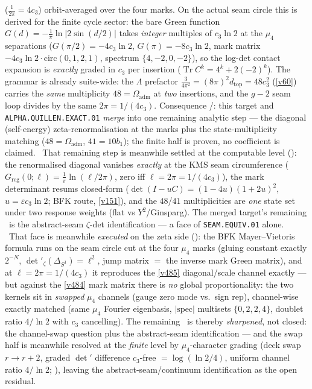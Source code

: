 ($\tfrac1{2\pi}=4c_3$) orbit-averaged over the four marks. On the actual seam circle this is derived for
the finite cycle sector: the bare Green function $G(d)=-\tfrac1\pi\ln|2\sin(d/2)|$ takes \emph{integer}
multiples of $c_3\ln2$ at the $\mu_4$ separations ($G(\pi/2)=-4c_3\ln2$, $G(\pi)=-8c_3\ln2$, mark matrix
$-4c_3\ln2\cdot\mathrm{circ}(0,1,2,1)$, spectrum $\{4,-2,0,-2\}$), so the log-det contact expansion is
\emph{exactly} graded in $c_3$ per insertion ($\operatorname{Tr}C^k=4^k+2(-2)^k$). The grammar is already
suite-wide: the $\Lambda$ prefactor $\tfrac{3}{4\pi^2}=(8\pi)^2 d_{\mathrm{top}}=48c_3^2$ (\vref{v60})
carries the \emph{same} multiplicity $48=\Omega_{\mathrm{adm}}$ at \emph{two} insertions, and the $g{-}2$
seam loop divides by the same $2\pi=1/(4c_3)$. Consequence \mC/\mO: this target and
\texttt{ALPHA.QUILLEN.EXACT.01} \emph{merge} into one remaining analytic step --- the diagonal
(self-energy) zeta-renormalisation at the marks plus the state-multiplicity matching
($48=\Omega_{\mathrm{adm}}$, $41=10b_1$); the finite half is proven, no coefficient is claimed. \mE\ That
remaining step is meanwhile settled at the computable level ():
the renormalised diagonal vanishes \emph{exactly} at the KMS seam circumference
($G_{\mathrm{reg}}(0;\ell)=\tfrac1\pi\ln(\ell/2\pi)$, zero iff $\ell=2\pi=1/(4c_3)$), the mark
determinant resums closed-form ($\det(I-uC)=(1-4u)(1+2u)^2$, $u=\varepsilon c_3\ln2$; BFK route,
\vref{v151}), and the $48$/$41$ multiplicities are \emph{one} state set under two response weights (flat
vs $Y^2$/Ginsparg). The merged target's remaining \mO\ is the abstract-seam $\zeta$-det identification
--- a face of \texttt{SEAM.EQUIV.01} alone. \mE\ That face is meanwhile \emph{executed} on the zeta side
(): the BFK Mayer--Vietoris formula runs on the seam circle cut at
the four $\mu_4$ marks (gluing constant exactly $2^{-N}$, $\det\nolimits'_\zeta(\Delta_{S^1})=\ell^2$,
jump matrix $=$ the inverse mark Green matrix), and at $\ell=2\pi=1/(4c_3)$ it reproduces the \vref{v485}
diagonal/scale channel exactly --- but against the \vref{v484} mark matrix there is \emph{no} global
proportionality: the two kernels sit in \emph{swapped} $\mu_4$ channels (gauge zero mode vs.\ sign rep),
channel-wise exactly matched (same $\mu_4$ Fourier eigenbasis, $|\mathrm{spec}|$ multisets $\{0,2,2,4\}$,
doublet ratio $4/\ln2$ with $c_3$ cancelling). The remaining \mO\ is thereby \emph{sharpened}, not
closed: the channel-swap question plus the abstract-seam identification --- and the swap half is
meanwhile resolved at the \emph{finite} level by $\mu_4$-character grading (deck swap $r\to r{+}2$,
graded $\det'$ difference $c_3$-free $=\log(\ln2/4)$, uniform channel ratio $4/\ln2$;
), leaving the abstract-seam/continuum identification as the
open residual.

